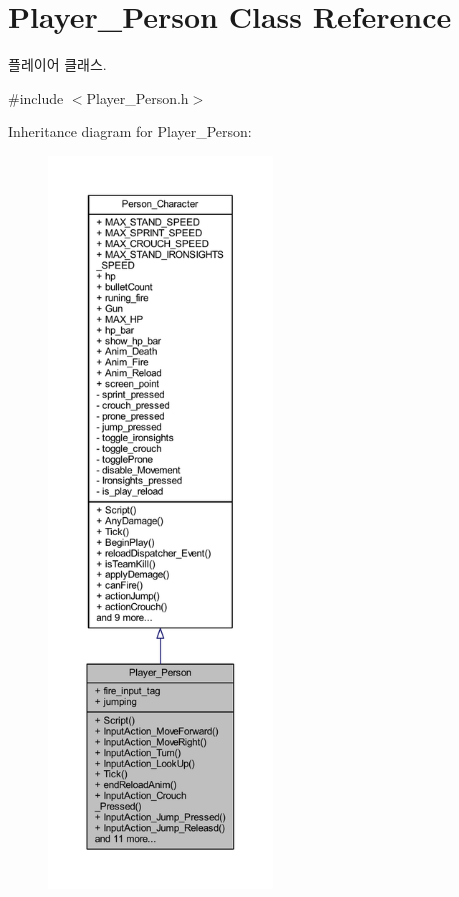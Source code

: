 \hypertarget{class_player___person}{}\section{Player\+\_\+\+Person Class Reference}
\label{class_player___person}


플레이어 클래스.  




{\ttfamily \#include $<$Player\+\_\+\+Person.\+h$>$}



Inheritance diagram for Player\+\_\+\+Person\+:\nopagebreak
\begin{figure}[H]
\begin{center}
\leavevmode
\includegraphics[height=550pt]{class_player___person__inherit__graph}
\end{center}
\end{figure}


